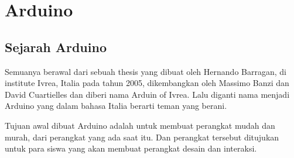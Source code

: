 \section{Arduino}
\subsection{Sejarah Arduino}
	Semuanya berawal dari sebuah thesis yang dibuat oleh Hernando Barragan, di institute Ivrea, Italia pada tahun 2005, dikembangkan oleh Massimo Banzi dan David Cuartielles dan diberi nama Arduin of Ivrea. Lalu diganti nama menjadi Arduino yang dalam bahasa Italia berarti teman yang berani.

	Tujuan awal dibuat Arduino adalah untuk membuat perangkat mudah dan murah, dari perangkat yang ada saat itu. Dan perangkat tersebut ditujukan untuk para siswa yang akan membuat perangkat desain dan interaksi.
